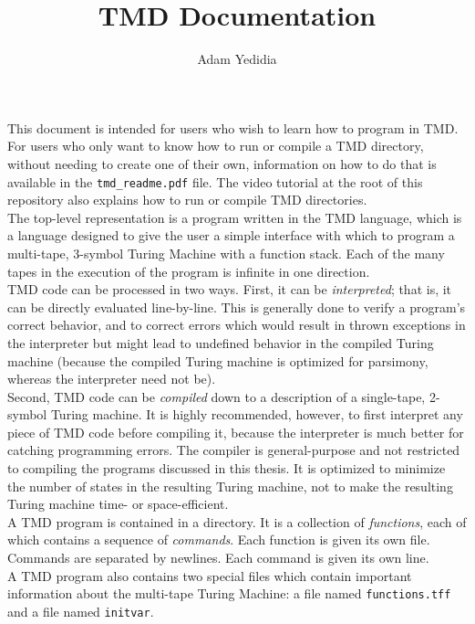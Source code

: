 \documentclass[11pt]{article}
\title{TMD Documentation}
\author{Adam Yedidia}
\begin{document}
    
\maketitle

This document is intended for users who wish to learn how to program in TMD. For users who only want to know how to run or compile a TMD directory, without needing to create one of their own, information on how to do that is available in the \texttt{tmd\_readme.pdf} file. The video tutorial at the root of this repository also explains how to run or compile TMD directories. \\

The top-level representation is a program written in the TMD language, which is a language designed to give the user a simple interface with which to program a multi-tape, 3-symbol Turing Machine with a function stack. Each of the many tapes in the execution of the program is infinite in one direction. \\

TMD code can be processed in two ways. First, it can be \emph{interpreted}; that is, it can be directly evaluated line-by-line. This is generally done to verify a program's correct behavior, and to correct errors which would result in thrown exceptions in the interpreter but might lead to undefined behavior in the compiled Turing machine (because the compiled Turing machine is optimized for parsimony, whereas the interpreter need not be). \\

Second, TMD code can be \emph{compiled} down to a description of a single-tape, 2-symbol Turing machine. It is highly recommended, however, to first interpret any piece of TMD code before compiling it, because the interpreter is much better for catching programming errors. The compiler is general-purpose and not restricted to compiling the programs discussed in this thesis. It is optimized to minimize the number of states in the resulting Turing machine, not to make the resulting Turing machine time- or space-efficient. \\

A TMD program is contained in a directory. It is a collection of \emph{functions}, each of which contains a sequence of \emph{commands}. Each function is given its own file. Commands are separated by newlines. Each command is given its own line. \\

A TMD program also contains two special files which contain important information about the multi-tape Turing Machine: a file named {\tt functions.tff} and a file named {\tt initvar}. \\ 
\end{document}
